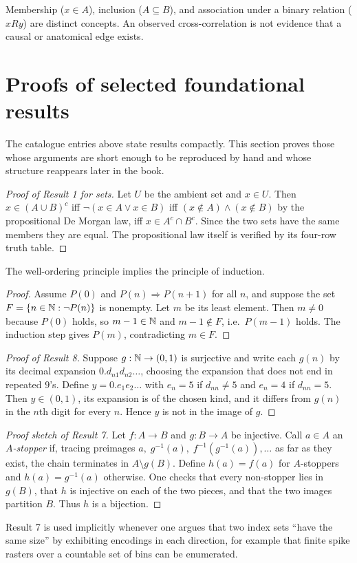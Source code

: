 \begin{caution}
Membership ($x\in A$), inclusion ($A\subseteq B$), and association
under a binary relation ($xRy$) are distinct concepts. An observed
cross-correlation is not evidence that a causal or anatomical edge exists.
\end{caution}
\section{Proofs of selected foundational results}
The catalogue entries above state results compactly. This section proves
those whose arguments are short enough to be reproduced by hand and
whose structure reappears later in the book.

\begin{proof}[Proof of Result 1 for sets]
Let $U$ be the ambient set and $x\in U$. Then $x\in(A\cup B)^c$
iff $\neg(x\in A\lor x\in B)$ iff $(x\notin A)\land(x\notin B)$
by the propositional De Morgan law, iff $x\in A^c\cap B^c$.
Since the two sets have the same members they are equal. The
propositional law itself is verified by its four-row truth table.
\end{proof}

\begin{proposition}
The well-ordering principle implies the principle of induction.
\end{proposition}
\begin{proof}
Assume $P(0)$ and $P(n)\Rightarrow P(n+1)$ for all $n$, and suppose
the set $F=\{n\in\mathbb{N}:\neg P(n)\}$ is nonempty. Let $m$ be its least
element. Then $m\ne0$ because $P(0)$ holds, so $m-1\in\mathbb{N}$ and
$m-1\notin F$, i.e.\ $P(m-1)$ holds. The induction step gives $P(m)$,
contradicting $m\in F$.
\end{proof}

\begin{proof}[Proof of Result 8]
Suppose $g:\mathbb{N}\to(0,1)$ is surjective and write each $g(n)$ by its
decimal expansion $0.d_{n1}d_{n2}\ldots$, choosing the expansion that
does not end in repeated $9$'s. Define $y=0.e_1e_2\ldots$ with
$e_n=5$ if $d_{nn}\ne5$ and $e_n=4$ if $d_{nn}=5$. Then $y\in(0,1)$,
its expansion is of the chosen kind, and it differs from $g(n)$ in the
$n$th digit for every $n$. Hence $y$ is not in the image of $g$.
\end{proof}

\begin{proof}[Proof sketch of Result 7]
Let $f:A\to B$ and $g:B\to A$ be injective. Call $a\in A$ an
\emph{$A$-stopper} if, tracing preimages
$a,\;g^{-1}(a),\;f^{-1}(g^{-1}(a)),\ldots$ as far as they exist,
the chain terminates in $A\setminus g(B)$. Define $h(a)=f(a)$ for
$A$-stoppers and $h(a)=g^{-1}(a)$ otherwise. One checks that every
non-stopper lies in $g(B)$, that $h$ is injective on each of the two
pieces, and that the two images partition $B$. Thus $h$ is a bijection.
\end{proof}
Result 7 is used implicitly whenever one argues that two index sets
``have the same size'' by exhibiting encodings in each direction, for
example that finite spike rasters over a countable set of bins can be
enumerated.

